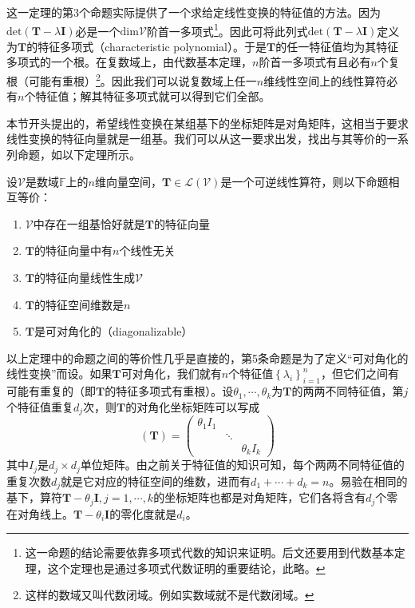 \documentclass[main.tex]{subfiles}
\begin{document}
这一定理的第3个命题实际提供了一个求给定线性变换的特征值的方法。因为$\mathrm{det}\left(\mathbf{T}-\lambda\mathbf{I}\right)$必是一个$\mathrm{dim}\mathcal{V}$阶首一多项式\footnote{这一命题的结论需要依靠多项式代数的知识来证明。后文还要用到代数基本定理，这个定理也是通过多项式代数证明的重要结论，此略。}。因此可将此列式$\mathrm{det}\left(\mathbf{T}-\lambda\mathbf{I}\right)$定义为$\mathbf{T}$的特征多项式（characteristic polynomial）。于是$\mathbf{T}$的任一特征值均为其特征多项式的一个根。在复数域上，由代数基本定理，$n$阶首一多项式有且必有$n$个复根（可能有重根）\footnote{这样的数域又叫代数闭域。例如实数域就不是代数闭域。}。因此我们可以说复数域上任一$n$维线性空间上的线性算符必有$n$个特征值；解其特征多项式就可以得到它们全部。

本节开头提出的，希望线性变换在某组基下的坐标矩阵是对角矩阵，这相当于要求线性变换的特征向量就是一组基。我们可以从这一要求出发，找出与其等价的一系列命题，如以下定理所示。

\begin{theorem}
设$\mathcal{V}$是数域$\mathbb{F}$上的$n$维向量空间，$\mathbf{T}\in\mathcal{L}\left(\mathcal{V}\right)$是一个可逆线性算符，则以下命题相互等价：
\begin{enumerate}
    \item $\mathcal{V}$中存在一组基恰好就是$\mathbf{T}$的特征向量
    \item $\mathbf{T}$的特征向量中有$n$个线性无关
    \item $\mathbf{T}$的特征向量线性生成$\mathcal{V}$
    \item $\mathbf{T}$的特征空间维数是$n$
    \item $\mathbf{T}$是可对角化的（diagonalizable）
\end{enumerate}
\end{theorem}

以上定理中的命题之间的等价性几乎是直接的\cite[\S5.2“矩阵可对角化的条件”,p.123]{周胜林2012线性代数}，第5条命题是为了定义“可对角化的线性变换”而设。如果$\mathbf{T}$可对角化，我们就有$n$个特征值$\left\{\lambda_i\right\}_{i=1}^n$，但它们之间有可能有重复的（即$\mathbf{T}$的特征多项式有重根）。设$\theta_1,\cdots,\theta_k$为$\mathbf{T}$的两两不同特征值，第$j$个特征值重复$d_j$次，则$\mathbf{T}$的对角化坐标矩阵可以写成
\[\left(\mathbf{T}\right)=\left(\begin{array}{ccc}\theta_1I_1&&\\&\ddots&\\&&\theta_kI_k\end{array}\right)\]
其中$I_j$是$d_j\times d_j$单位矩阵。由之前关于特征值的知识可知，每个两两不同特征值的重复次数$d_j$就是它对应的特征空间的维数，进而有$d_1+\cdots+d_k=n$。易验在相同的基下，算符$\mathbf{T}-\theta_j\mathbf{I},j=1,\cdots,k$的坐标矩阵也都是对角矩阵，它们各将含有$d_j$个零在对角线上。$\mathbf{T}-\theta_i\mathbf{I}$的零化度就是$d_i$。
\end{document}
